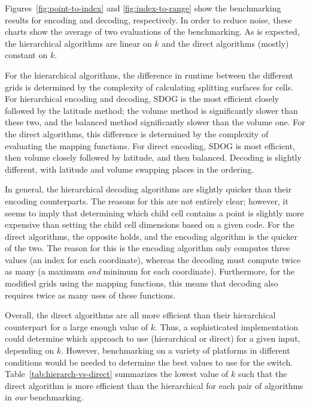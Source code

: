 Figures~\ref{fig:point-to-index} and \ref{fig:index-to-range} show the benchmarking results for encoding and decoding, respectively.
In order to reduce noise, these charts show the average of two evaluations of the benchmarking.
As is expected, the hierarchical algorithms are linear on $k$ and the direct algorithms (mostly) constant on $k$.


For the hierarchical algorithms, the difference in runtime between the different grids is determined by the complexity of calculating splitting surfaces for cells.
For hierarchical encoding and decoding, SDOG is the most efficient closely followed by the latitude method; the volume method is significantly slower than these two, and the balanced method significantly slower than the volume one.
For the direct algorithms, this difference is determined by the complexity of evaluating the mapping functions.
For direct encoding, SDOG is most efficient, then volume closely followed by latitude, and then balanced.
Decoding is slightly different, with latitude and volume swapping places in the ordering.


In general, the hierarchical decoding algorithms are slightly quicker than their encoding counterparts.
The reasons for this are not entirely clear; however, it seems to imply that determining which child cell contains a point is slightly more expensive than setting the child cell dimensions based on a given code.
For the direct algorithms, the opposite holds, and the encoding algorithm is the quicker of the two.
The reason for this is the encoding algorithm only computes three values (an index for each coordinate), whereas the decoding must compute twice as many (a maximum \textit{and} minimum for each coordinate).
Furthermore, for the modified grids using the mapping functions, this means that decoding also requires twice as many uses of these functions.


Overall, the direct algorithms are all more efficient than their hierarchical counterpart for a large enough value of $k$.
Thus, a sophisticated implementation could determine which approach to use (hierarchical or direct) for a given input, depending on $k$.
However, benchmarking on a variety of platforms in different conditions would be needed to determine the best values to use for the switch.
Table~\ref{tab:hierarch-vs-direct} summarizes the lowest value of $k$ such that the direct algorithm is more efficient than the hierarchical for each pair of algorithms in \textit{our} benchmarking.


